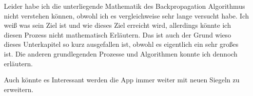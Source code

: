 Leider habe ich die unterliegende Mathematik des Backpropagation Algorithmus nicht verstehen können, obwohl ich es vergleichweise sehr lange versucht habe. Ich weiß was sein Ziel ist und wie dieses Ziel erreicht wird, allerdings könnte ich diesen Prozess nicht mathematisch Erläutern. Das ist auch der Grund wieso dieses Unterkapitel so kurz ausgefallen ist, obwohl es eigentlich ein sehr großes ist. Die anderen grundlegenden Prozesse und Algorithmen konnte ich dennoch erläutern.

Auch könnte es Interessant werden die App immer weiter mit neuen Siegeln zu erweitern.